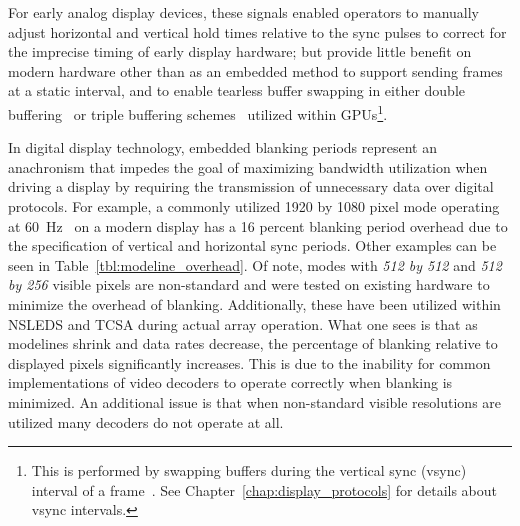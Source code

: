     For early analog display devices, these signals enabled operators to manually adjust horizontal and vertical hold times relative to the sync pulses to correct for the imprecise timing of early display hardware; but provide little benefit on modern hardware other than as an embedded method to support sending frames at a static interval, and to enable tearless buffer swapping in either double buffering~\cite{FriedbergEtAl1990} or triple buffering schemes~\cite{3dfx1997} utilized within GPUs\footnote{This is performed by swapping buffers during the vertical sync (vsync) interval of a frame~\cite{3dfx1999,3dfx1999_2}. See Chapter~\ref{chap:display_protocols} for details about vsync intervals.}.

    In digital display technology, embedded blanking periods represent an anachronism that impedes the goal of maximizing bandwidth utilization when driving a display by requiring the transmission of unnecessary data over digital protocols. For example, a commonly utilized 1920 by 1080 pixel mode operating at \mbox{60 Hz}~\cite{MythTV2015} on a modern display has a 16 percent blanking period overhead due to the specification of vertical and horizontal sync periods. Other examples can be seen in Table~\ref{tbl:modeline_overhead}. Of note, modes with {\it 512 by 512} and {\it 512 by 256} visible pixels are non-standard and were tested on existing hardware to minimize the overhead of blanking. Additionally, these have been utilized within NSLEDS and TCSA during actual array operation. What one sees is that as modelines shrink and data rates decrease, the percentage of blanking relative to displayed pixels significantly increases. This is due to the inability for common implementations of video decoders to operate correctly when blanking is minimized. An additional issue is that when non-standard visible resolutions are utilized many decoders do not operate at all.

